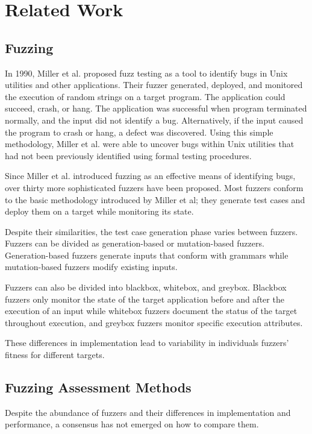 \section{Related Work}

\subsection{Fuzzing}
In 1990, Miller et al. proposed fuzz testing as a tool to identify bugs in Unix utilities and other 
applications. Their fuzzer generated, deployed, and monitored the execution of random strings on a 
target program. The application could succeed, crash, or hang. The application was successful when 
program terminated normally, and the input did not identify a bug. Alternatively, if the input caused 
the program to crash or hang, a defect was discovered. Using this simple methodology, Miller et al. 
were able to uncover bugs within Unix utilities that had not been previously identified using formal 
testing procedures. \cite{miller_empirical_1990}

Since Miller et al. introduced fuzzing as an effective means of identifying bugs, over thirty more 
sophisticated fuzzers have been proposed. Most fuzzers conform to the basic methodology introduced by 
Miller et al; they generate test cases and deploy them on a target while monitoring its state. 

Despite their similarities, the test case generation phase varies between fuzzers. Fuzzers can be 
divided as generation-based or mutation-based fuzzers. Generation-based fuzzers generate inputs that 
conform with grammars while mutation-based fuzzers modify existing inputs. 

Fuzzers can also be divided into blackbox, whitebox, and greybox. Blackbox fuzzers only monitor the 
state of the target application before and after the execution of an input while whitebox fuzzers 
document the status of the target throughout execution, and greybox fuzzers monitor specific 
execution attributes. \cite{zhu_fuzzing_2022}

These differences in implementation lead to variability in individuals fuzzers' fitness for
different targets.

\subsection{Fuzzing Assessment Methods}
Despite the abundance of fuzzers and their differences in implementation and performance, a consensus
 has not emerged on how to compare them.

